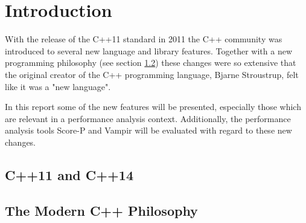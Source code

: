\section{Introduction}

With the release of the C++11 standard in 2011 the C++ community was introduced to several new language and library features\cite{cpp11std}. Together with a new programming philosophy (see section \ref{subs:intro_philosophy}) these changes were so extensive that the original creator of the C++ programming language, Bjarne Stroustrup, felt like it was a "new language"\cite{tcpp}.

In this report some of the new features will be presented, especially those which are relevant in a performance analysis context. Additionally, the performance analysis tools Score-P and Vampir will be evaluated with regard to these new changes.

\subsection{C++11 and C++14}

\subsection{The Modern C++ Philosophy}\label{subs:intro_philosophy}
